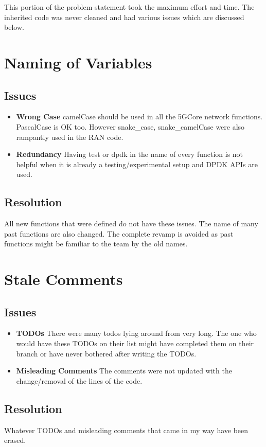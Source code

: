 This portion of the problem statement took the maximum effort and time.
The inherited code was never cleaned and had various issues which are discussed below.
\section{Naming of Variables}
\subsection{Issues}
\begin{itemize}
	\item \textbf{Wrong Case} camelCase should be used in all the 5GCore network functions. PascalCase is OK too. 
	However snake\_case, snake\_camelCase were also rampantly used in the RAN code. 
	\item \textbf{Redundancy} Having test or dpdk in the name of every function is not helpful when it is already
	a testing/experimental setup and DPDK APIs are used. 
\end{itemize}
\subsection{Resolution}
All new functions that were defined do not have these issues. The name of many past functions are also changed.
The complete revamp is avoided as past functions might be familiar to the team by the old names.

\section{Stale Comments}
\subsection{Issues}
\begin{itemize}
	\item \textbf{TODOs} There were many todos lying around from very long. 
	The one who would have these TODOs on their list might have completed them on their branch 
	or have never bothered after writing the TODOs.
	\item \textbf{Misleading Comments} The comments were not updated with the change/removal of the lines of 
	the code.
\end{itemize}

\subsection{Resolution}
Whatever TODOs and misleading comments that came in my way have been erased.
